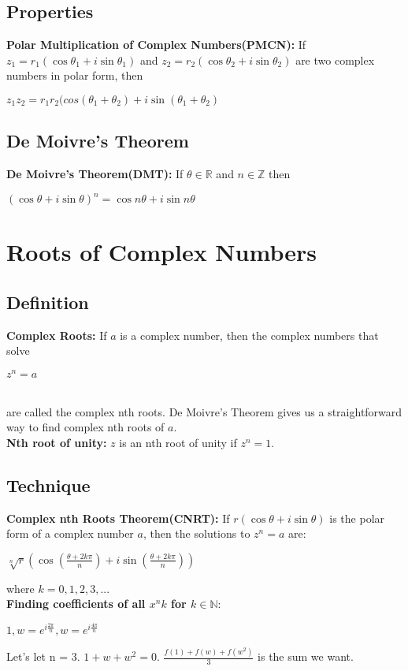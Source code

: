 \documentclass[12pt]{report}
\begin{document}
		\subsection{Properties}
			\textbf{Polar Multiplication of Complex Numbers(PMCN):} If $z_1 = r_1(\cos \theta_1 + i \sin \theta_1)$ and $z_2 = r_2(\cos \theta_2 + i \sin \theta_2)$ are two complex numbers in polar form, then \\
			\centerline{$z_1z_2 = r_1r_2(cos(\theta_1 + \theta_2) + i \sin (\theta_1 + \theta_2)$}
		\subsection{De Moivre's Theorem}
			\textbf{De Moivre's Theorem(DMT):} If $\theta \in \mathbb{R}$ and $n \in \mathbb{Z}$ then \\
			\centerline{$(\cos \theta + i \sin \theta)^n = \cos n\theta + i \sin n\theta$}				
	\section{Roots of Complex Numbers}
		\subsection{Definition}
			\textbf{Complex Roots: }If $a$ is a complex number, then the complex numbers that solve \\
			\centerline{$z^n = a$} \\
			are called the complex nth roots. De Moivre's Theorem gives us a straightforward way to find complex nth roots of $a$.\\
			\textbf{Nth root of unity:} $z$ is an nth root of unity if $z^n = 1$.
		\subsection{Technique}
			\textbf{Complex nth Roots Theorem(CNRT):} If $r(\cos \theta + i \sin \theta)$ is the polar form of a complex number $a$, then the solutions to $z^n = a$ are:\\
			\centerline{$\sqrt[n]{r}(\cos (\frac{\theta + 2k\pi}{n}) + i \sin (\frac{\theta + 2k\pi}{n}))$}
			where $k = 0,1,2,3,...$\\
			\textbf{Finding coefficients of all $x^nk$ for $k \in \mathbb{N}$}: \\
			\centerline{$1, w = e^{i\frac{2\pi}{n}}, w = e^{i\frac{4\pi}{n}}$}
			Let's let n = 3. $1 + w + w^2 = 0$. $\frac{f(1) + f(w) + f(w^2)}{3}$ is the sum we want.
			
\end{document}
